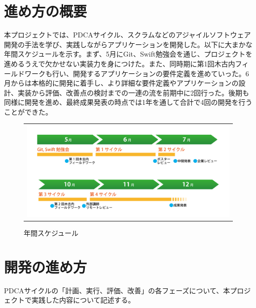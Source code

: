 \section{進め方の概要}
本プロジェクトでは、PDCAサイクル、スクラムなどのアジャイルソフトウェア開発の手法を学び、実践しながらアプリケーションを開発した。以下に大まかな年間スケジュールを示す。まず、5月にGit、Swift勉強会を通じ、プロジェクトを進めるうえで欠かせない実装力を身につけた。また、同時期に第1回木古内フィールドワークも行い、開発するアプリケーションの要件定義を進めていった。6月からは本格的に開発に着手し、より詳細な要件定義やアプリケーションの設計、実装から評価、改善点の検討までの一連の流を前期中に2回行った。後期も同様に開発を進め、最終成果発表の時点では1年を通して合計で4回の開発を行うことができた。
\begin{figure}[htbp]
  \begin{flushleft}
    \begin{tabular}{c}

      \begin{minipage}{0.7\hsize}
        \begin{center}
\includegraphics[width=15cm, bb=0 0 1478 674]{procedure-1.png}
       
        \end{center}
      \end{minipage}

    \end{tabular}
    \caption{年間スケジュール}
    \label{fig:lena}
  \end{flushleft}
\end{figure}



\section{開発の進め方}
PDCAサイクルの「計画、実行、評価、改善」の各フェーズについて、本プロジェクトで実践した内容について記述する。
